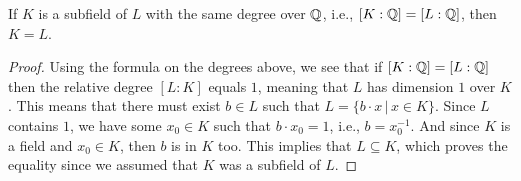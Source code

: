 \begin{lemma}
\label{lemma:equality-subfields}
If $K$ is a subfield of $L$ with the same degree over $\mathbb{Q}$, i.e., $[K:\mathbb{Q}] = [L:\mathbb{Q}]$, then $K = L$.
\end{lemma}

\begin{proof}
Using the formula on the degrees above, we see that if $[K:\mathbb{Q}] = [L:\mathbb{Q}]$ then the relative degree $[L:K]$ equals $1$, meaning that $L$ has dimension $1$ over $K$. This means that there must exist $b \in L$ such that $L = \{b \cdot x\,|\, x \in K\}$. Since $L$ contains $1$, we have some $x_0 \in K$ such that $b \cdot x_0 = 1$, i.e., $b = x_0^{-1}$. And since $K$ is a field and $x_0 \in K$, then $b$ is in $K$ too. This implies that $L \subseteq K$, which proves the equality since we assumed that $K$ was a subfield of $L$.
\end{proof}


